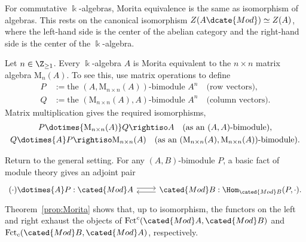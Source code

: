 \begin{example}
	For commutative $\Bbbk$-algebras, Morita equivalence is the same as
	isomorphism of algebras. This rests on the canonical isomorphism
	$Z(A\dcate{Mod})\simeq Z(A)$, where the left-hand side is the center of
	the abelian category and the right-hand side is the center of the
	$\Bbbk$-algebra.
\end{example}

\begin{example}
	Let $n\in\Z_{\geq1}$. Every $\Bbbk$-algebra $A$ is Morita equivalent to
	the $n\times n$ matrix algebra $\mathrm{M}_n(A)$. To see this, use matrix
	operations to define
	\begin{align*}
		P & := \text{the $(A,\mathrm{M}_{n \times n}(A))$-bimodule } A^n \quad \text{(row vectors)}, \\
		Q & := \text{the $(\mathrm{M}_{n \times n}(A),A)$-bimodule } A^n \quad \text{(column vectors)}.
	\end{align*}
	Matrix multiplication gives the required isomorphisms,
	\begin{gather*}
		P \dotimes{\mathrm{M}_{n \times n}(A)} Q \rightiso A \quad \text{(as an $(A,A)$-bimodule)}, \\
		Q \dotimes{A} P \rightiso \mathrm{M}_{n \times n}(A) \quad \text{(as an $(\mathrm{M}_{n \times n}(A), \mathrm{M}_{n \times n}(A))$-bimodule)}.
	\end{gather*}
\end{example}

Return to the general setting. For any $(A,B)$-bimodule $P$, a basic fact of
module theory \cite[Theorem 6.6.5]{Li1} gives an adjoint pair
\begin{equation}\label{eqn:AB-adjunction}\begin{tikzcd}
	(\cdot) \dotimes{A} P : \cated{Mod}A \arrow[shift left, r] & \cated{Mod}B: \Hom_{\cated{Mod}B}(P, \cdot). \arrow[shift left, l]
\end{tikzcd}\end{equation}
Theorem~\ref{prop:Morita} shows that, up to isomorphism, the functors on the
left and right exhaust the objects of
$\mathrm{Fct}^c(\cated{Mod}A,\cated{Mod}B)$ and
$\mathrm{Fct}_c(\cated{Mod}B,\cated{Mod}A)$, respectively.

